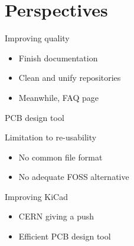 \documentclass[compress,red]{beamer}
\begin{document}
\section{Perspectives}

\begin{frame}{Improving quality}

  \begin{block}{}
    \begin{itemize}
    \item Finish documentation
    \item Clean and unify repositories
    \item Meanwhile, FAQ page
    \end{itemize}
  \end{block}

\end{frame}

\begin{frame}{PCB design tool}

  \begin{block}{Limitation to re-usability}
    \begin{itemize}
    \item No common file format
    \item No adequate FOSS alternative
    \end{itemize}
  \end{block}

  \begin{block}{Improving KiCad}
    \begin{itemize}
    \item CERN giving a push
    \item Efficient PCB design tool
    \end{itemize}
  \end{block}

\end{frame}
\end{document}
